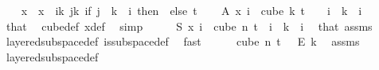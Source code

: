 \begin{isabellebody}
\ \ \isamarkupfalse%
\ x\ \ {\isachardoublequoteopen}x\ {\isasymequiv}\ {\isacharparenleft}{\kern0pt}{\isasymlambda}i{\isasymin}{\isacharbraceleft}{\kern0pt}{\isachardot}{\kern0pt}{\isachardot}{\kern0pt}k{\isacharbraceright}{\kern0pt}{\isachardot}{\kern0pt}\ {\isasymlambda}j{\isasymin}{\isacharbraceleft}{\kern0pt}{\isachardot}{\kern0pt}{\isachardot}{\kern0pt}{\isacharless}{\kern0pt}k{\isacharbraceright}{\kern0pt}{\isachardot}{\kern0pt}\ {\isacharparenleft}{\kern0pt}if\ j\ {\isacharless}{\kern0pt}\ k\ {\isacharminus}{\kern0pt}\ i\ then\ {}\ else\ t{\isacharparenright}{\kern0pt}{\isacharparenright}{\kern0pt}{\isachardoublequoteclose}\isanewline
\isanewline
\ \ \isamarkupfalse%
\ A{\isacharcolon}{\kern0pt}\ {\isachardoublequoteopen}x\ i\ {\isasymin}\ cube\ k\ {\isacharparenleft}{\kern0pt}t\ {\isacharplus}{\kern0pt}\ {}{\isacharparenright}{\kern0pt}{\isachardoublequoteclose}\ \ {\isachardoublequoteopen}i\ {\isasymle}\ k{\isachardoublequoteclose}\ \ i\ \isamarkupfalse%
\ that\ \isamarkupfalse%
\ cube{\isacharunderscore}{\kern0pt}def\ x{\isacharunderscore}{\kern0pt}def\ \isamarkupfalse%
\ simp\isanewline
\ \ \isamarkupfalse%
\ \isamarkupfalse%
\ {\isachardoublequoteopen}S\ {\isacharparenleft}{\kern0pt}x\ i{\isacharparenright}{\kern0pt}\ {\isasymin}\ cube\ n\ {\isacharparenleft}{\kern0pt}t{\isacharplus}{\kern0pt}{}{\isacharparenright}{\kern0pt}{\isachardoublequoteclose}\ \ {\isachardoublequoteopen}i\ {\isasymle}\ k{\isachardoublequoteclose}\ \ i\ \isamarkupfalse%
\ that\ assms{\isacharparenleft}{\kern0pt}{}{\isacharparenright}{\kern0pt}\ \isamarkupfalse%
\ layered{\isacharunderscore}{\kern0pt}subspace{\isacharunderscore}{\kern0pt}def\ is{\isacharunderscore}{\kern0pt}subspace{\isacharunderscore}{\kern0pt}def\ \isamarkupfalse%
\ fast\isanewline
\isanewline
\ \ \isamarkupfalse%
\ {\isachardoublequoteopen}{\isasymchi}\ {\isasymin}\ cube\ n\ {\isacharparenleft}{\kern0pt}t\ {\isacharplus}{\kern0pt}\ {}{\isacharparenright}{\kern0pt}\ {\isasymrightarrow}\isactrlsub E\ {\isacharbraceleft}{\kern0pt}{\isachardot}{\kern0pt}{\isachardot}{\kern0pt}{\isacharless}{\kern0pt}k{\isacharbraceright}{\kern0pt}{\isachardoublequoteclose}\ \isamarkupfalse%
\ assms\ \isamarkupfalse%
\ layered{\isacharunderscore}{\kern0pt}subspace{\isacharunderscore}{\kern0pt}def\ \isamarkupfalse%

\end{isabellebody}
